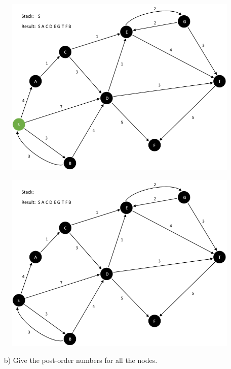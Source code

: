 \documentclass{article}
\begin{document}
\begin{enumerate}[leftmargin=\labelsep]
\begin{figure}[H]
\centering
\includegraphics[scale=0.6]{images/Q5/a/17.png}
\end{figure}

\begin{figure}[H]
\centering
\includegraphics[scale=0.6]{images/Q5/a/18.png}
\end{figure}

\newpage
  \begin{enumerate}[leftmargin=\labelsep]
    \item[b)] Give the post-order numbers for all the nodes.
  \end{enumerate}


\end{enumerate}
\end{document}
